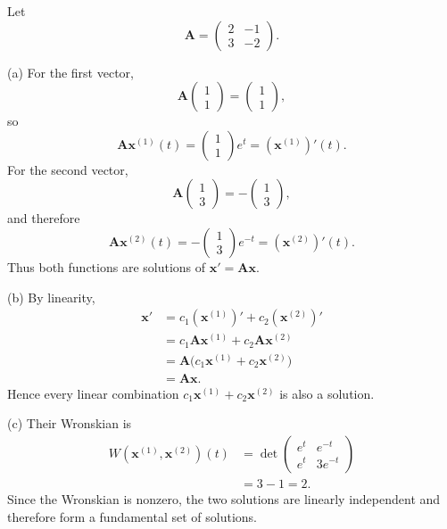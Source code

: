 \documentclass[11pt,oneside]{article}
\begin{document}
\begin{solution}
Let
\[
    \mathbf{A}=\begin{pmatrix}2&-1\\3&-2\end{pmatrix}.
\]

\noindent\textup{(a)} For the first vector,
\[
    \mathbf{A}\begin{pmatrix}1\\1\end{pmatrix}
    =\begin{pmatrix}1\\1\end{pmatrix},
\]
so
\[
    \mathbf{A}\mathbf{x}^{(1)}(t)
    =\begin{pmatrix}1\\1\end{pmatrix}e^t
    =(\mathbf{x}^{(1)})'(t).
\]
For the second vector,
\[
    \mathbf{A}\begin{pmatrix}1\\3\end{pmatrix}
    =-\begin{pmatrix}1\\3\end{pmatrix},
\]
and therefore
\[
    \mathbf{A}\mathbf{x}^{(2)}(t)
    =-\begin{pmatrix}1\\3\end{pmatrix}e^{-t}
    =(\mathbf{x}^{(2)})'(t).
\]
Thus both functions are solutions of $\mathbf{x}'=\mathbf{A}\mathbf{x}$.

\medskip
\noindent\textup{(b)} By linearity,
\[
\begin{aligned}
    \mathbf{x}'
    &=c_1(\mathbf{x}^{(1)})'+c_2(\mathbf{x}^{(2)})'\\
    &=c_1\mathbf{A}\mathbf{x}^{(1)}+c_2\mathbf{A}\mathbf{x}^{(2)}\\
    &=\mathbf{A}\bigl(c_1\mathbf{x}^{(1)}+c_2\mathbf{x}^{(2)}\bigr)\\
    &=\mathbf{A}\mathbf{x}.
\end{aligned}
\]
Hence every linear combination $c_1\mathbf{x}^{(1)}+c_2\mathbf{x}^{(2)}$ is also a solution.

\medskip
\noindent\textup{(c)} Their Wronskian is
\[
\begin{aligned}
    W(\mathbf{x}^{(1)},\mathbf{x}^{(2)})(t)
    &=\det\begin{pmatrix}
        e^t&e^{-t}\\
        e^t&3e^{-t}
    \end{pmatrix}\\
    &=3-1=2.
\end{aligned}
\]
Since the Wronskian is nonzero, the two solutions are linearly independent and therefore form a fundamental set of solutions.


\end{solution}
\end{document}
